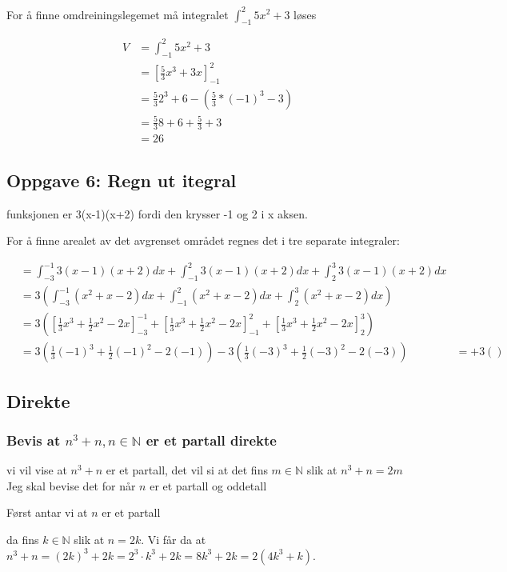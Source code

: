 \documentclass{article}
\begin{document}
For å finne omdreiningslegemet må integralet $\int_{-1}^{2} 5x^2+3$ løses

\begin{align*}
    V &= \int_{-1}^{2} 5x^2+3 \\
    &= [\frac{5}{3}x^3+3x]^{2}_{-1} \\
    &= \frac{5}{3}2^3+6-(\frac{5}{3}*(-1)^3-3) \\
    &= \frac{5}{3}8 + 6 + \frac{5}{3} + 3 \\
    &= 26
\end{align*}

\subsection{Oppgave 6: Regn ut itegral}

funksjonen er 3(x-1)(x+2) fordi den krysser -1 og 2 i x aksen.

For å finne arealet av det avgrenset området regnes det i tre separate integraler:

\begin{align*}
    &= \int_{-3}^{-1}3(x-1)(x+2)dx  + \int_{-1}^{2}3(x-1)(x+2)dx + \int_{2}^{3}3(x-1)(x+2)dx \\
    &= 3(\int_{-3}^{-1}(x^2+x-2) dx + \int_{-1}^{2}(x^2+x-2) dx + \int_{2}^{3}(x^2+x-2) dx) \\
    &= 3([\frac{1}{3}x^3+\frac{1}{2}x^2-2x]^{-1}_{-3} + [\frac{1}{3}x^3+\frac{1}{2}x^2-2x]^{2}_{-1} + [\frac{1}{3}x^3+\frac{1}{2}x^2-2x]^{3}_{2}) \\
    &= 3(\frac{1}{3}(-1)^3 + \frac{1}{2}(-1)^2 - 2(-1)) - 3(\frac{1}{3}(-3)^3 + \frac{1}{2}(-3)^2 - 2(-3))
    &= + 3()
\end{align*}


\subsection{Direkte}

\subsubsection{Bevis at $n^3+n, n \in \mathbb{N}$ er et partall direkte}


vi vil vise at $n^3+n$ er et partall, det vil si at det fins $m \in \mathbb{N}$ slik at $n^3+n=2m$
Jeg skal bevise det for når $n$ er et partall og oddetall

Først antar vi at $n$ er et partall

da fins $k \in \mathbb{N}$ slik at $n=2k$. Vi får da at $n^3+n=(2k)^3+2k=2^3 \cdot k^3+2k=8k^3+2k=2(4k^3+k)$.
\end{document}
